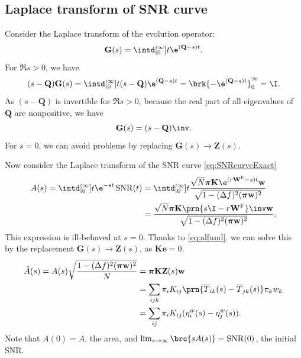 \documentclass[12pt]{article}
\newcommand{\onev}{\mathbf{e}}
\newcommand{\MMm}{Q}
\newcommand{\MM}{\mathbf{\MMm}}
\newcommand{\eqm}{\pi}
\newcommand{\eq}{\boldsymbol{\eqm}}
\newcommand{\fptm}{T}
\newcommand{\fptbm}{\overline{\fptm}}
\newcommand{\fundm}{Z}
\newcommand{\fund}{\mathbf{\fundm}}
\newcommand{\etwm}{\eta^w}
\newcommand{\wm}{w}
\newcommand{\w}{\mathbf{\wm}}
\newcommand{\Wm}{W}
\newcommand{\W}{\mathbf{\Wm}}
\newcommand{\encm}{K}
\newcommand{\enc}{\mathbf{\encm}}
\newcommand{\frg}{\W^{\mathrm{F}}}
\DeclareMathOperator{\SNR}{SNR}
\begin{document}
\subsection{Laplace transform of SNR curve}\label{sec:laplaceSNR}

Consider the Laplace transform of the evolution operator:
%
\begin{equation}\label{eq:levol}
  \mathbf{G}(s) = \intd[_0^{\infty}]{t} \e^{(\MM-s) t}.
\end{equation}
%
For \(\Re s>0\), we have
%
\begin{equation}\label{eq:levolcalc}
  (s-\MM)\mathbf{G}(s) = \intd[_0^{\infty}]{t} (s-\MM)\e^{(\MM-s) t} = \brk{-\e^{(\MM-s) t}}_0^{\infty} = \I.
\end{equation}
%
As \((s-\MM)\) is invertible for \(\Re s>0\), because the real part of all eigenvalues of \(\MM\) are nonpositive, we have
%
\begin{equation}\label{eq:levolres}
  \mathbf{G}(s) = (s-\MM)\inv.
\end{equation}
%
For \(s=0\), we can avoid problems by replacing \(\mathbf{G}(s) \to \fund(s)\).

Now consider the Laplace transform of the SNR curve \eqref{eq:SNRcurveExact}
%
\begin{equation}\label{eq:lsnr}
\begin{aligned}
  A(s) = \intd[_0^{\infty}]{t} \e^{-st}\SNR(t) 
   &= \intd[_0^{\infty}]{t} \frac{ \sqrt{N} \eq \enc \e^{(r\frg-s)t} \w }
                                { \sqrt{1-(\Delta f)^2(\eq\w)^2} } \\
   &= \frac{\sqrt{N} \eq \enc \prn{s \I - r\frg}\inv \w }{\sqrt{1-(\Delta f)^2(\eq\w)^2}}.
\end{aligned}
\end{equation}
%
This expression is ill-behaved at \(s=0\).
Thanks to \eqref{eq:alfund}, we can solve this by the replacement \(\mathbf{G}(s) \to \fund(s)\), as \(\enc\onev=0\).
%
\begin{equation}\label{eq:larea}
\begin{aligned}
  \hat{A}(s) = A(s) \sqrt{\frac{{{1-(\Delta f)^2(\eq\w)^2}}}{N}}  &=  \eq \enc \fund(s) \w \\
    &= \sum_{ijk} \eqm_i \encm_{ij} \prn{\fptbm_{ik}(s)-\fptbm_{jk}(s)} \eqm_k \wm_k \\
    &= \sum_{ij}  \eqm_i \encm_{ij} (\etwm_{i}(s) - \etwm_{j}(s)).
\end{aligned}
\end{equation}
%
Note that \(A(0)=A\), the area, and \(\lim_{s\to\infty} \brc{sA(s)} = \SNR(0)\), the initial SNR.
\end{document}
